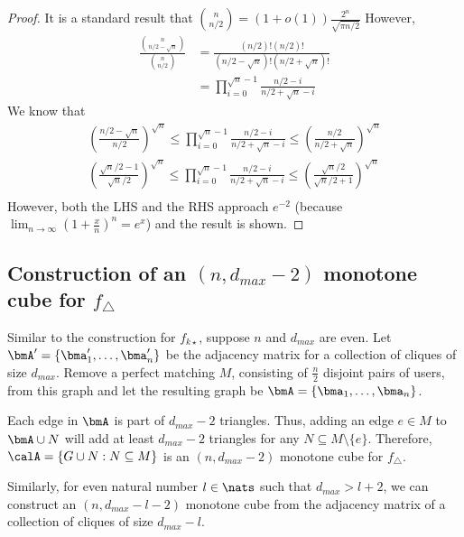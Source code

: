 \begin{proof}
It is a standard result that $\binom{n}{n/2} = (1+o(1)) \frac{2^{n}}{\sqrt{\pi n/2}}$
However,
\begin{align*}
    \frac{\binom{n}{n/2-\sqrt{n}}}{\binom{n}{n/2}} &= \frac{(n/2)!(n/2)!}{(n/2-\sqrt{n})!(n/2+\sqrt{n})!} \\
    &= \prod_{i=0}^{\sqrt{n}-1} \frac{n/2-i}{n/2+\sqrt{n}-i}
\end{align*}
We know that
\begin{align*}
    \left(\frac{n/2-\sqrt{n}}{n/2}\right)^{\sqrt{n}} \leq \prod_{i=0}^{\sqrt{n}-1} \frac{n/2-i}{n/2+\sqrt{n}-i} \leq \left(\frac{n/2}{n/2+\sqrt{n}} \right)^{\sqrt{n}} \\
    \left(\frac{\sqrt{n}/2-1}{\sqrt{n}/2}\right)^{\sqrt{n}} \leq \prod_{i=0}^{\sqrt{n}-1} \frac{n/2-i}{n/2+\sqrt{n}-i} \leq \left(\frac{\sqrt{n}/2}{\sqrt{n}/2+1} \right)^{\sqrt{n}} \\
\end{align*}
However, both the LHS and the RHS approach $e^{-2}$ (because $\lim_{n \rightarrow \infty} (1+\frac{x}{n})^n = e^x$) and the result is shown.
\end{proof}


\subsection{Construction of an $(n, d_{max}-2)$ monotone cube for $f_\triangle$}
\label{sub:cube_triangle}
Similar to the construction for $f_{k\star}$, suppose $n$ and $d_{max}$ are
even. Let $\bmA' = \{\bma_1', \ldots, \bma_n'\}$ be the adjacency matrix for a 
collection of cliques of size $d_{max}$. 
Remove a perfect matching $M$, consisting of $\frac{n}{2}$
disjoint pairs of users, from this graph and let the
resulting graph be $\bmA = \{\bma_1, \ldots, \bma_n\}$. 

Each edge in $\bmA$ is part of
$d_{max}-2$ 
triangles. 
Thus, adding an edge $e \in M$ to $\bmA \cup N$ will
add at least $d_{max}-2$ triangles for any $N \subseteq M \setminus \{e\}$. Therefore, 
$\calA = \{G \cup N : N \subseteq
M\}$ is an $(n,d_{max}-2)$ monotone cube for $f_\triangle$.

Similarly, for even natural number $l \in \nats$ such that $d_{max}>l+2$, we can construct an $(n,d_{max}-l-2)$ monotone cube from the adjacency matrix of a collection of cliques of size $d_{max}-l$.


